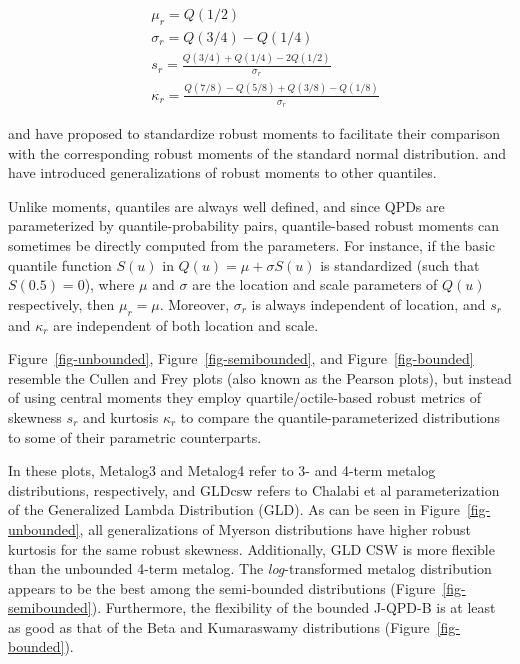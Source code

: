 \documentclass[
  fleqn,
  deca,
  blindrev
]{informs4}
\begin{document}
\[
\begin{aligned}
&\mu_r=Q(1/2)\\
&\sigma_r=Q(3/4)-Q(1/4)\\
&s_r=\frac{Q(3/4)+Q(1/4)-2Q(1/2)}{\sigma_r}\\
&\kappa_r=\frac{Q(7/8)-Q(5/8)+Q(3/8)-Q(1/8)}{\sigma_r}
\end{aligned}
\]

\citet{kim2004MoreRobustEstimation} and
\citet{arachchige2022RobustAnalogsCoefficient} have proposed to
standardize robust moments to facilitate their comparison with the
corresponding robust moments of the standard normal distribution.
\citet{groeneveld1998ClassQuantileMeasures} and
\citet{jones2011SkewnessInvariantMeasuresKurtosis} have introduced
generalizations of robust moments to other quantiles.

Unlike moments, quantiles are always well defined, and since QPDs are
parameterized by quantile-probability pairs, quantile-based robust
moments can sometimes be directly computed from the parameters. For
instance, if the basic quantile function \(S(u)\) in
\(Q(u)=\mu+\sigma S(u)\) is standardized (such that \(S(0.5)=0\)), where
\(\mu\) and \(\sigma\) are the location and scale parameters of \(Q(u)\)
respectively, then \(\mu_r=\mu\). Moreover, \(\sigma_r\) is always
independent of location, and \(s_r\) and \(\kappa_r\) are independent of
both location and scale.

Figure~\ref{fig-unbounded}, Figure~\ref{fig-semibounded}, and
Figure~\ref{fig-bounded} resemble the Cullen and Frey
\citep{cullen1999ProbabilisticTechniquesExposure} plots (also known as
the Pearson plots), but instead of using central moments they employ
quartile/octile-based robust metrics of skewness \(s_r\) and kurtosis
\(\kappa_r\) to compare the quantile-parameterized distributions to some
of their parametric counterparts.

In these plots, Metalog3 and Metalog4 refer to 3- and 4-term metalog
distributions, respectively, and GLDcsw refers to Chalabi et al
\citep{chalabi2012FlexibleDistributionModeling} parameterization of the
Generalized Lambda Distribution (GLD). As can be seen in
Figure~\ref{fig-unbounded}, all generalizations of Myerson distributions
have higher robust kurtosis for the same robust skewness. Additionally,
GLD CSW is more flexible than the unbounded 4-term metalog. The
\emph{log}-transformed metalog distribution appears to be the best among
the semi-bounded distributions (Figure~\ref{fig-semibounded}).
Furthermore, the flexibility of the bounded J-QPD-B is at least as good
as that of the Beta and Kumaraswamy distributions
(Figure~\ref{fig-bounded}).
\end{document}
